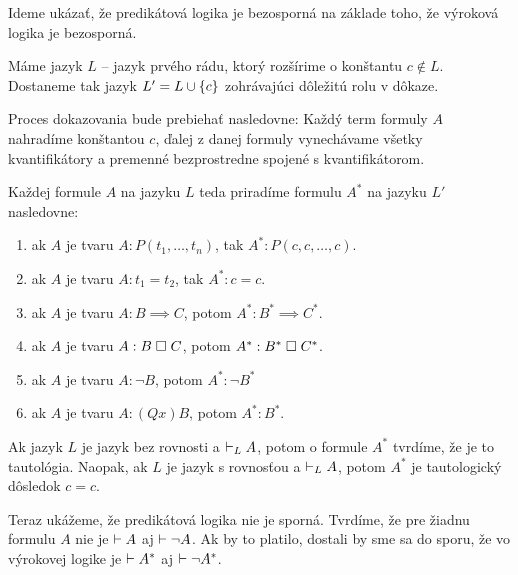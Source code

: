 \begin{priklad}
    Ideme ukázať, že predikátová logika je bezosporná na základe toho,
    že výroková logika je bezosporná.

    Máme jazyk $L$ -- jazyk prvého rádu,
    ktorý rozšírime o konštantu $c \notin L$.
    Dostaneme tak jazyk $L' = L \cup \{c\}$ zohrávajúci dôležitú
    rolu v dôkaze.

    Proces dokazovania bude prebiehať nasledovne:
    Každý term formuly $A$ nahradíme konštantou $c$,
    ďalej z danej formuly vynechávame všetky kvantifikátory a
    premenné bezprostredne spojené s kvantifikátorom.

    Každej formule $A$ na jazyku $L$ teda priradíme
    formulu $A^*$ na jazyku $L'$ nasledovne:
    \begin{enumerate}
        \item ak $A$ je tvaru $A: P(t_1, \dots ,t_n)$,
                tak $A^*: P(c, c, \dots,c)$.
        \item ak $A$ je tvaru $A: t_1=t_2$,
                tak $A^*: c=c$.
        \item ak $A$ je tvaru $A: B \implies C$,
                potom $A^*: B^* \implies C^*$.
        \item ak $A$ je tvaru $A: B \;\square\; C$,
                potom $A^*: B^* \;\square\; C^*$.
        \item ak $A$ je tvaru $A: \neg B$,
                potom $A^*: \neg B^*$
        \item ak $A$ je tvaru $A: (Qx) B$, potom $A^*: B^*$.
    \end{enumerate}

    Ak jazyk $L$ je jazyk bez rovnosti a $\vdash_L A$, potom
    o formule $A^*$ tvrdíme, že je to tautológia. 
    Naopak, ak $L$ je jazyk s rovnosťou a $\vdash_L A$,
    potom $A^*$ je tautologický dôsledok $c=c$.

    Teraz ukážeme, že predikátová logika nie je sporná.
    Tvrdíme, že pre žiadnu formulu $A$ nie je $\vdash A$ aj 
    $\vdash \neg A$.
    Ak by to platilo, dostali by sme sa do sporu,
    že vo výrokovej logike je $\vdash A^*$ aj $\vdash \neg A^*$.
\end{priklad}
